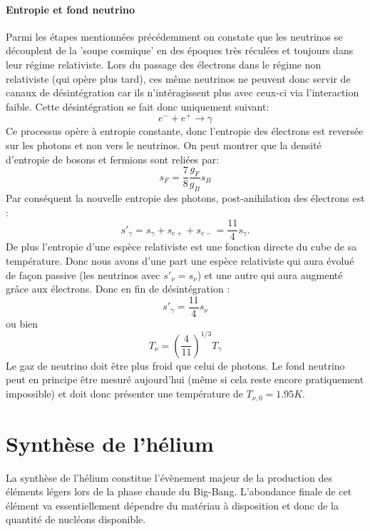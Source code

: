 \paragraph{Entropie et fond neutrino} 
Parmi les étapes mentionnées précédemment on constate que les neutrinos se découplent de la 'soupe cosmique' en des époques très réculées et toujours dans leur régime relativiste. Lors du passage des électrons dans le régime non relativiste (qui opère plus tard), ces même neutrinos ne peuvent donc servir de canaux de désintégration car ils n'intéragissent plus avec ceux-ci via l'interaction faible. Cette désintégration se fait donc uniquement suivant:
\begin{equation}
e^-+e^+\rightarrow \gamma
\end{equation}
Ce processus opère à entropie constante, donc l'entropie des électrons est reversée sur les photons et non vers le neutrinos. On peut montrer que la densité d'entropie de bosons et fermions sont reliées par:
\begin{equation}
s_F=\frac{7}{8}\frac{g_F}{g_B} s_B
\end{equation}
Par conséquent la nouvelle entropie des photons, post-anihilation des électrons est :
\begin{equation}
s'_\gamma=s_\gamma+s_{e+}+s_{e-}=\frac{11}{4}s_\gamma.
\end{equation}
De plus l'entropie d'une espèce relativiste est une fonction directe du cube de sa température. Donc nous avons d'une part une espèce relativiste qui aura évolué de façon passive  (les neutrinos avec $s'_\nu=s_\nu$) et une autre qui aura augmenté grâce aux électrons. Donc en fin de désintégration :
\begin{equation}
s'_\gamma=\frac{11}{4} s_\nu
\end{equation}
ou bien
\begin{equation}
T_\nu=\left(\frac{4}{11}\right)^{1/3} T_\gamma
\end{equation}
Le gaz de neutrino doit être plus froid que celui de photons. Le fond neutrino peut en principe être mesuré aujourd'hui (même si cela reste encore pratiquement impossible) et doit donc présenter une température de  $T_{\nu,0}=1.95 K$.

\section{Synthèse de l'hélium}
La synthèse de l'hélium constitue l'évènement majeur de la production des éléments légers lors de la phase chaude du Big-Bang. L'abondance finale de cet élément va essentiellement dépendre du matériau à disposition et donc de la quantité de nucléons disponible.

